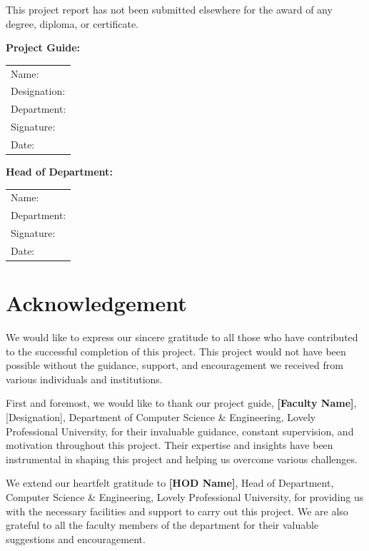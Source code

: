 \documentclass[12pt,a4paper]{report}
\begin{document}
This project report has not been submitted elsewhere for the award of any degree, diploma, or certificate.

\vspace{2cm}

\begin{flushleft}
\textbf{Project Guide:}
\end{flushleft}

\begin{tabular}{l}
Name: \hrulefill \\
Designation: \hrulefill \\
Department: \hrulefill \\
Signature: \hrulefill \\
Date: \hrulefill
\end{tabular}

\vspace{2cm}

\begin{flushleft}
\textbf{Head of Department:}
\end{flushleft}

\begin{tabular}{l}
Name: \hrulefill \\
Department: \hrulefill \\
Signature: \hrulefill \\
Date: \hrulefill
\end{tabular}

\newpage
\chapter*{Acknowledgement}

We would like to express our sincere gratitude to all those who have contributed to the successful completion of this project. This project would not have been possible without the guidance, support, and encouragement we received from various individuals and institutions.

First and foremost, we would like to thank our project guide, \textbf{[Faculty Name]}, [Designation], Department of Computer Science \& Engineering, Lovely Professional University, for their invaluable guidance, constant supervision, and motivation throughout this project. Their expertise and insights have been instrumental in shaping this project and helping us overcome various challenges.

We extend our heartfelt gratitude to \textbf{[HOD Name]}, Head of Department, Computer Science \& Engineering, Lovely Professional University, for providing us with the necessary facilities and support to carry out this project. We are also grateful to all the faculty members of the department for their valuable suggestions and encouragement.
\end{document}
